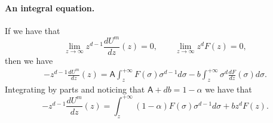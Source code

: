 \documentclass[a4paper]{article}
\theoremstyle{definition}
\begin{document}
\paragraph{An integral equation.} If we have that
\begin{equation}
  \lim_{z \to \infty} z^{d-1}\frac{dU^{m}}{dz}(z) = 0,
  \qquad
  \lim_{z\to \infty} z^d F(z) = 0,
\end{equation}
then we have
\begin{align*}
  -z^{d-1} \frac{dU^{m}}{dz} (z) = \mathsf A \int_z^{+\infty} F(\sigma) \sigma^{d-1}d\sigma - b \int_{z}^{+\infty} \sigma^d \frac{dF}{dz}(\sigma) d \sigma.
\end{align*}
Integrating by parts and noticing that $\mathsf A + db = 1-\alpha$ we have that
\begin{equation}
  \label{eq:equation for dUm/dz}
  -z^{d-1} \frac{dU^{m}}{dz} (z) =  \int_z^{+\infty} ({1-\alpha}) F(\sigma) \sigma^{d-1} d\sigma + b z^{d} F(z).
\end{equation}
\end{document}
